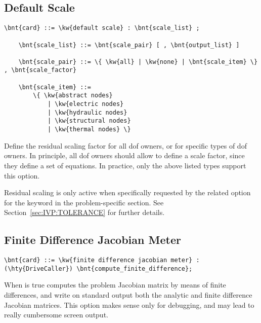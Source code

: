 \subsection{Default Scale}\label{sec:CONTROLDATA:DEFAULTSCALE}
\begin{Verbatim}[commandchars=\\\{\}]
    \bnt{card} ::= \kw{default scale} : \bnt{scale_list} ;

    \bnt{scale_list} ::= \bnt{scale_pair} [ , \bnt{output_list} ]

    \bnt{scale_pair} ::= \{ \kw{all} | \kw{none} | \bnt{scale_item} \} , \bnt{scale_factor}

    \bnt{scale_item} ::=
        \{ \kw{abstract nodes}
            | \kw{electric nodes}
            | \kw{hydraulic nodes}
            | \kw{structural nodes}
            | \kw{thermal nodes} \}
\end{Verbatim}
Define the residual scaling factor for all dof owners, or for specific
types of dof owners.
In principle, all dof owners should allow to define a scale factor,
since they define a set of equations.
In practice, only the above listed types support this option.

Residual scaling is only active when specifically requested
by the related option for the  keyword
in the problem-specific section.
See Section~\ref{sec:IVP:TOLERANCE} for further details.

\subsection{Finite Difference Jacobian Meter}\label{sec:CONTROLDATA:FDJAC_METER}
\begin{Verbatim}[commandchars=\\\{\}]
    \bnt{card} ::= \kw{finite difference jacobian meter} : (\hty{DriveCaller}) \bnt{compute_finite_difference};
\end{Verbatim}

\noindent
When  is true computes the problem Jacobian matrix by means of finite differences, 
and write on standard output both the analytic and finite difference Jacobian matrices.
This option makes sense only for debugging, and may lead to really cumbersome screen output.

